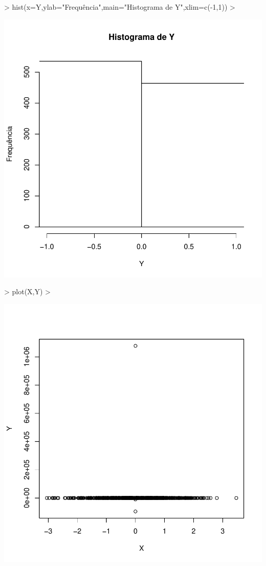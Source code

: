 \documentclass{article}
\begin{document}
\begin{enumerate}
\begin{enumerate}
\begin{Schunk}
\begin{Sinput}
> hist(x=Y,ylab="Frequência",main="Histograma de Y",xlim=c(-1,1))
> 
\end{Sinput}
\end{Schunk}
\includegraphics{transformacao-008}
\begin{Schunk}
\begin{Sinput}
> plot(X,Y)
> 
\end{Sinput}
\end{Schunk}
\includegraphics{transformacao-009}



\end{enumerate}
\end{enumerate}
\end{document}
